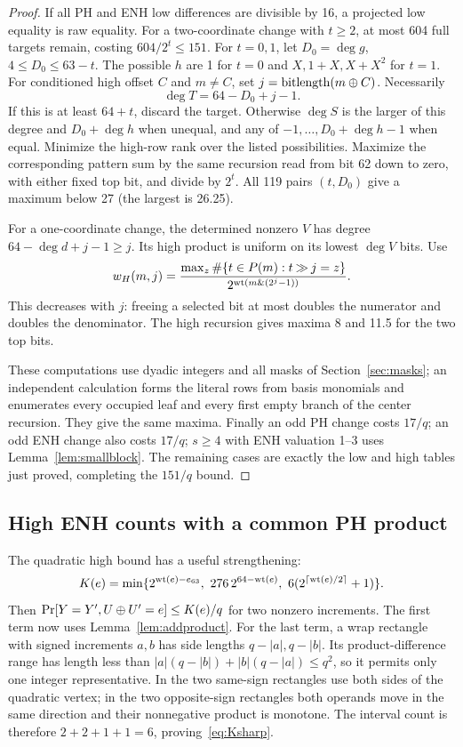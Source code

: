 \begin{proof}
If all PH and ENH low differences are divisible by 16, a projected low equality is raw equality. For a two-coordinate change with $t\ge2$, at most 604 full targets remain, costing $604/2^t\le151$. For $t=0,1$, let $D_0=\deg g$, $4\le D_0\le63-t$. The possible $h$ are 1 for $t=0$ and $X,1+X,X+X^2$ for $t=1$. For conditioned high offset $C$ and $m\ne C$, set $j=\operatorname{bitlength}(m\mathbin\oplus C)$. Necessarily
\[
 \deg T=64-D_0+j-1.
\]
If this is at least $64+t$, discard the target. Otherwise $\deg S$ is the larger of this degree and $D_0+\deg h$ when unequal, and any of $-1,\ldots,D_0+\deg h-1$ when equal. Minimize the high-row rank over the listed possibilities. Maximize the corresponding pattern sum by the same recursion read from bit 62 down to zero, with either fixed top bit, and divide by $2^t$. All 119 pairs $(t,D_0)$ give a maximum below 27 (the largest is 26.25).

For a one-coordinate change, the determined nonzero $V$ has degree $64-\deg d+j-1\ge j$. Its high product is uniform on its lowest $\deg V$ bits. Use
\begin{equation}\label{eq:whigh}
 w_H(m,j)=\frac{\max_z\#\{t\in P(m):t\mathbin{\gg}j=z\}}
 {2^{\operatorname{wt}(m\mathbin{\&}(2^j-1))}}.
\end{equation}
This decreases with $j$: freeing a selected bit at most doubles the numerator and doubles the denominator. The high recursion gives maxima 8 and 11.5 for the two top bits.

These computations use dyadic integers and all masks of Section~\ref{sec:masks}; an independent calculation forms the literal rows from basis monomials and enumerates every occupied leaf and every first empty branch of the center recursion. They give the same maxima. Finally an odd PH change costs $17/q$; an odd ENH change also costs $17/q$; $s\ge4$ with ENH valuation 1--3 uses Lemma~\ref{lem:smallblock}. The remaining cases are exactly the low and high tables just proved, completing the $151/q$ bound.
\end{proof}

\subsection{High ENH counts with a common PH product}
The quadratic high bound has a useful strengthening:
\begin{equation}\label{eq:Ksharp}
 K(e)=\min\{2^{\wt(e)-e_{63}},\ 276\,2^{64-\wt(e)},\ 6(2^{\ceil{\wt(e)/2}}+1)\}.
\end{equation}
Then $\mathop{\rm Pr}[Y=Y',U\mathbin\oplus U'=e]\le K(e)/q$ for two nonzero increments. The first term now uses Lemma~\ref{lem:addproduct}. For the last term, a wrap rectangle with signed increments $a,b$ has side lengths $q-|a|,q-|b|$. Its product-difference range has length less than
$|a|(q-|b|)+|b|(q-|a|)\le q^2$, so it permits only one integer representative. In the two same-sign rectangles use both sides of the quadratic vertex; in the two opposite-sign rectangles both operands move in the same direction and their nonnegative product is monotone. The interval count is therefore $2+2+1+1=6$, proving~\eqref{eq:Ksharp}.

